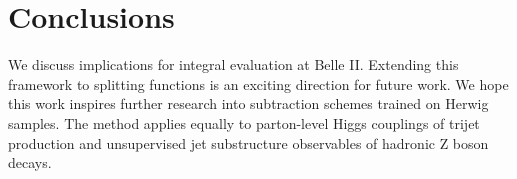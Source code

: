 \section{Conclusions}\label{sec:conclusions}

We discuss implications for integral evaluation at Belle II. Extending
this framework to splitting functions is an exciting direction for
future work. We hope this work inspires further research into
subtraction schemes trained on Herwig samples. The method applies
equally to parton-level Higgs couplings of trijet production and
unsupervised jet substructure observables of hadronic Z boson decays.

